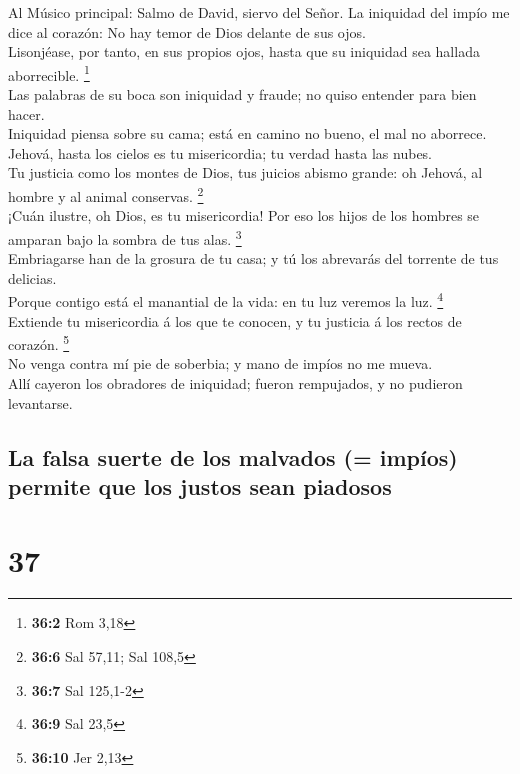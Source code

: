  Al Músico principal: Salmo de David, siervo del Señor. La
iniquidad del impío me dice al corazón: No hay temor de Dios delante de
sus ojos.\\
 Lisonjéase, por tanto, en sus propios ojos, hasta que su
iniquidad sea hallada aborrecible. \footnote{\textbf{36:2} Rom 3,18}\\
 Las palabras de su boca son iniquidad y fraude; no quiso
entender para bien hacer.\\
 Iniquidad piensa sobre su cama; está en camino no bueno, el
mal no aborrece.\\
 Jehová, hasta los cielos es tu misericordia; tu verdad
hasta las nubes.\\
 Tu justicia como los montes de Dios, tus juicios abismo
grande: oh Jehová, al hombre y al animal conservas. \footnote{\textbf{36:6}
  Sal 57,11; Sal 108,5}\\
 ¡Cuán ilustre, oh Dios, es tu misericordia! Por eso los
hijos de los hombres se amparan bajo la sombra de tus alas.
\footnote{\textbf{36:7} Sal 125,1-2}\\
 Embriagarse han de la grosura de tu casa; y tú los
abrevarás del torrente de tus delicias.\\
 Porque contigo está el manantial de la vida: en tu luz
veremos la luz. \footnote{\textbf{36:9} Sal 23,5}\\
 Extiende tu misericordia á los que te conocen, y tu
justicia á los rectos de corazón. \footnote{\textbf{36:10} Jer 2,13}\\
 No venga contra mí pie de soberbia; y mano de impíos no me
mueva.\\
 Allí cayeron los obradores de iniquidad; fueron
rempujados, y no pudieron levantarse.

\hypertarget{la-falsa-suerte-de-los-malvados-impuxedos-permite-que-los-justos-sean-piadosos}{%
\subsection{La falsa suerte de los malvados (= impíos) permite que los
justos sean
piadosos}\label{la-falsa-suerte-de-los-malvados-impuxedos-permite-que-los-justos-sean-piadosos}}

\hypertarget{section-36}{%
\section{37}\label{section-36}}

